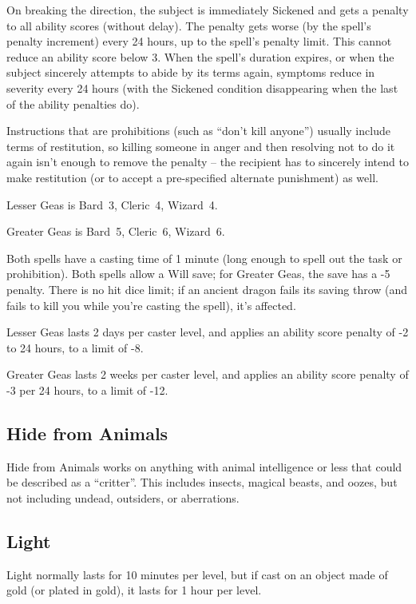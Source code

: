 On breaking the direction, the subject is immediately Sickened and gets a
penalty to all ability scores (without delay). The penalty gets worse (by
the spell's penalty increment) every 24 hours, up to the spell's penalty
limit. This cannot reduce an ability score below 3. When the spell's
duration expires, or when the subject sincerely attempts to abide by its
terms again, symptoms reduce in severity every 24 hours (with the Sickened
condition disappearing when the last of the ability penalties do).

Instructions that are prohibitions (such as ``don't kill anyone'') usually
include terms of restitution, so killing someone in anger and then resolving
not to do it again isn't enough to remove the penalty -- the recipient has
to sincerely intend to make restitution (or to accept a pre-specified
alternate punishment) as well.

Lesser Geas is Bard~3, Cleric~4, Wizard~4.

Greater Geas is Bard~5, Cleric~6, Wizard~6.

Both spells have a casting time of 1 minute (long enough to spell out the
task or prohibition). Both spells allow a Will save; for Greater Geas, the
save has a -5 penalty. There is no hit dice limit; if an ancient dragon
fails its saving throw (and fails to kill you while you're casting the
spell), it's affected.

Lesser Geas lasts 2 days per caster level, and applies an ability score
penalty of -2 to 24 hours, to a limit of -8.

Greater Geas lasts 2 weeks per caster level, and applies an ability score
penalty of -3 per 24 hours, to a limit of -12.
%

%
\subsection{Hide from Animals}

Hide from Animals works on anything with animal intelligence or less that
could be described as a ``critter''. This includes insects, magical beasts,
and oozes, but not including undead, outsiders, or aberrations.
%

%
\subsection{Light}

Light normally lasts for 10 minutes per level, but if cast on an object
made of gold (or plated in gold), it lasts for 1 hour per level.

